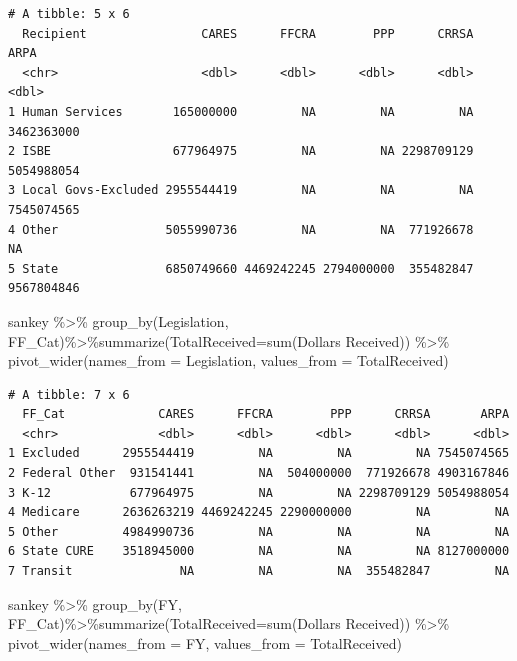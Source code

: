 \documentclass[
  letterpaper,
  DIV=11,
  numbers=noendperiod]{scrreport}
\newenvironment{Shaded}{\begin{snugshade}}{\end{snugshade}}
\newcommand{\AttributeTok}[1]{\textcolor[rgb]{0.40,0.45,0.13}{#1}}
\newcommand{\FunctionTok}[1]{\textcolor[rgb]{0.28,0.35,0.67}{#1}}
\newcommand{\NormalTok}[1]{\textcolor[rgb]{0.00,0.23,0.31}{#1}}
\newcommand{\SpecialCharTok}[1]{\textcolor[rgb]{0.37,0.37,0.37}{#1}}
\newcommand{\StringTok}[1]{\textcolor[rgb]{0.13,0.47,0.30}{#1}}
\begin{document}
\begin{verbatim}
# A tibble: 5 x 6
  Recipient                CARES      FFCRA        PPP      CRRSA       ARPA
  <chr>                    <dbl>      <dbl>      <dbl>      <dbl>      <dbl>
1 Human Services       165000000         NA         NA         NA 3462363000
2 ISBE                 677964975         NA         NA 2298709129 5054988054
3 Local Govs-Excluded 2955544419         NA         NA         NA 7545074565
4 Other               5055990736         NA         NA  771926678         NA
5 State               6850749660 4469242245 2794000000  355482847 9567804846
\end{verbatim}

\begin{Shaded}
\begin{Highlighting}[]
\NormalTok{sankey }\SpecialCharTok{\%\textgreater{}\%} \FunctionTok{group\_by}\NormalTok{(Legislation, FF\_Cat)}\SpecialCharTok{\%\textgreater{}\%}\FunctionTok{summarize}\NormalTok{(}\AttributeTok{TotalReceived=}\FunctionTok{sum}\NormalTok{(}\StringTok{\textasciigrave{}}\AttributeTok{Dollars Received}\StringTok{\textasciigrave{}}\NormalTok{)) }\SpecialCharTok{\%\textgreater{}\%} \FunctionTok{pivot\_wider}\NormalTok{(}\AttributeTok{names\_from =}\NormalTok{ Legislation, }\AttributeTok{values\_from =}\NormalTok{ TotalReceived)}
\end{Highlighting}
\end{Shaded}

\begin{verbatim}
# A tibble: 7 x 6
  FF_Cat             CARES      FFCRA        PPP      CRRSA       ARPA
  <chr>              <dbl>      <dbl>      <dbl>      <dbl>      <dbl>
1 Excluded      2955544419         NA         NA         NA 7545074565
2 Federal Other  931541441         NA  504000000  771926678 4903167846
3 K-12           677964975         NA         NA 2298709129 5054988054
4 Medicare      2636263219 4469242245 2290000000         NA         NA
5 Other         4984990736         NA         NA         NA         NA
6 State CURE    3518945000         NA         NA         NA 8127000000
7 Transit               NA         NA         NA  355482847         NA
\end{verbatim}

\begin{Shaded}
\begin{Highlighting}[]
\NormalTok{sankey }\SpecialCharTok{\%\textgreater{}\%} \FunctionTok{group\_by}\NormalTok{(FY, FF\_Cat)}\SpecialCharTok{\%\textgreater{}\%}\FunctionTok{summarize}\NormalTok{(}\AttributeTok{TotalReceived=}\FunctionTok{sum}\NormalTok{(}\StringTok{\textasciigrave{}}\AttributeTok{Dollars Received}\StringTok{\textasciigrave{}}\NormalTok{)) }\SpecialCharTok{\%\textgreater{}\%} \FunctionTok{pivot\_wider}\NormalTok{(}\AttributeTok{names\_from =}\NormalTok{ FY, }\AttributeTok{values\_from =}\NormalTok{ TotalReceived)}
\end{Highlighting}
\end{Shaded}
\end{document}
